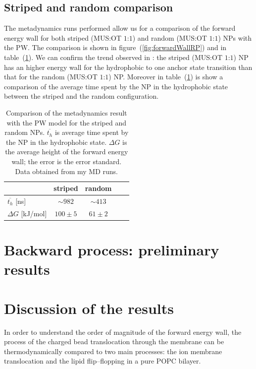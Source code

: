 \subsection{Striped and random comparison}
The metadynamics runs performed allow us for a comparison of the forward energy wall for both striped (\ac{MUS}:\ac{OT} $1$:$1$) and random (\ac{MUS}:\ac{OT} $1$:$1$) \acp{NP} with the \ac{PW}. The comparison is shown in figure~(\ref{fig:forwardWallRP}) and in table~(\ref{tab:hydroTimeRP}). We can confirm the trend observed in \cite{ourPaper}: the striped (\ac{MUS}:\ac{OT} $1$:$1$) \ac{NP} has an higher energy wall for the hydrophobic to one anchor state transition than that for the random (\ac{MUS}:\ac{OT} $1$:$1$) \ac{NP}. Moreover in table~(\ref{tab:hydroTimeRP}) is show a comparison of the average time spent by the \ac{NP} in the hydrophobic state between the striped and the random configuration.
\begin{table}[h!t]
	\centering
	\begin{tabular}{lcccc}
		\toprule
		\,					& striped		& random		\\ \toprule
	$\overline{t_{h}}$ [ns]	& $\sim 982$	& $\sim 413$	\\ \midrule
	$\Delta G$ [kJ/mol] 	& $100 \pm 5$ 	& $61 \pm 2$	\\ \bottomrule
	\end{tabular}
	\caption{Comparison of the metadynamics result with the \ac{PW} model for the striped and random \acp{NP}. $\overline{t_h}$ is average time spent by the \acs{NP} in the hydrophobic state. $\Delta G$ is the average height of the forward energy wall; the error is the error standard. Data obtained from my \acs{MD} runs.}
	\label{tab:hydroTimeRP}
\end{table}

 
\section{Backward process: preliminary results}


\section{Discussion of the results}
In order to understand the order of magnitude of the forward energy wall, the process of the charged bead translocation through the membrane can be thermodynamically compared to two main processes: the ion membrane translocation and the lipid flip--flopping in a pure \ac{POPC} bilayer.

